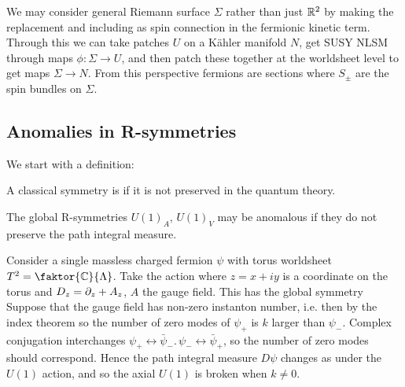 \documentclass{article}
\begin{document}
\begin{remark}
We may consider general Riemann surface $\Sigma$ rather than just $\mathbb{R}^2$ by making the replacement 
and including as spin connection in the fermionic kinetic term. Through this we can take patches $U$ on a K\"ahler manifold $N$, get SUSY NLSM through maps $\phi:\Sigma \to U$, and then patch these together at the worldsheet level to get maps $\Sigma \to N$. From this perspective fermions are sections 
where $S_\pm$ are the spin bundles on $\Sigma$. 
\end{remark}

\subsection{Anomalies in R-symmetries}
We start with a definition:
\begin{definition}
	A classical symmetry is  if it is not preserved in the quantum theory.  
\end{definition}
The global R-symmetries $U(1)_A, \, U(1)_V$ may be anomalous if they do not preserve the path integral measure. 

\begin{example}
	Consider a single massless charged fermion $\psi$ with torus worldsheet $T^2 = \faktor{\mbb{C}}{\Lambda}$. Take the action 
where $z=x+iy$ is a coordinate on the torus and $D_z=\partial_z + A_z$, $A$ the gauge field. This has the global symmetry
Suppose that the gauge field has non-zero instanton number, i.e. 
then by the index theorem 
so the number of zero modes of $\psi_+$ is $k$ larger than $\psi_-$. Complex conjugation interchanges $\psi_+ \leftrightarrow \bar{\psi}_-. \, \psi_- \leftrightarrow \bar{\psi}_+$, so the number of zero modes should correspond. Hence the path integral measure $D\psi$ changes as 
under the $U(1)$ action, and so the axial $U(1)$ is broken when $k \neq 0$. 
\end{example}
\end{document}
